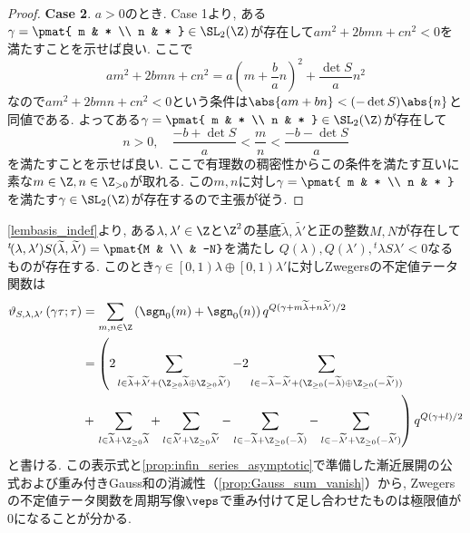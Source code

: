 \documentclass[11pt,b5paper,oneside,lualatex]{ltjsarticle} %
\numberwithin{equation}{section} %
\begin{document}
\begin{proof}
	\textbf{Case 2}. $ a > 0 $のとき. 
	Case 1より, ある$ \gamma = \pmat{ m & * \\ n & * } \in \SL_2(\Z) $が存在して$ a m^2 + 2b mn + c n^2 < 0 $を満たすことを示せば良い. 
	ここで
	\[
	a m^2 + 2b mn + c n^2
	=
	a \left( m + \frac{b}{a} n \right)^2 +\frac{\det S}{a} n^2
	\]
	なので$ a m^2 + 2b mn + c n^2 < 0 $という条件は$ \abs{ a m + b n } < (-\det S) \abs{n} $と同値である. 
	よってある$ \gamma = \pmat{ m & * \\ n & * } \in \SL_2(\Z) $が存在して
	\[
	n>0, \quad
	\frac{-b + \det S}{a} < \frac{m}{n} < \frac{-b - \det S}{a}
	\]
	を満たすことを示せば良い. 
	ここで有理数の稠密性からこの条件を満たす互いに素な$ m \in \Z, n \in \Z_{>0} $が取れる. 
	この$ m, n $に対し$ \gamma = \pmat{ m & * \\ n & * } $を満たす$ \gamma \in \SL_2(\Z) $が存在するので主張が従う. 
\end{proof}

\begin{rem} \label{rem:Zwegers_lim}
	\cref{lembasis_indef}より, ある$ \lambda, \lambda' \in \Z $と$ \Z^2 $の基底$ \widetilde{\lambda}, \widetilde{\lambda'} $と正の整数$ M, N $が存在して
	$ {}^t\!(\lambda, \lambda') S (\widetilde{\lambda}, \widetilde{\lambda'}) = \pmat{M & \\ & -N} $を満たし
	$ Q(\lambda), Q(\lambda'), {}^t\!\lambda S \lambda' < 0 $なるものが存在する. 
	このとき$ \gamma \in \left[ 0, 1\right) \lambda \oplus \left[ 0, 1\right) \lambda' $に対しZwegersの不定値テータ関数は
	\begin{align} 
		\vartheta_{S, \lambda, \lambda'} \left( \gamma \tau; \tau \right)
		&=
		\sum_{m, n \in \Z} \left( \sgn_0(m) + \sgn_0(n) \right) q^{Q(\gamma + m\widetilde{\lambda} + n\widetilde{\lambda'})/2}
		\\
		&=
		\left(
		2 \sum_{l \in \widetilde{\lambda} + \widetilde{\lambda'} + (\Z_{\ge 0} \widetilde{\lambda} \oplus \Z_{\ge 0} \widetilde{\lambda'})}
		-
		2 \sum_{l \in - \widetilde{\lambda} - \widetilde{\lambda'} + (\Z_{\ge 0} (-\widetilde{\lambda}) \oplus \Z_{\ge 0} (-\widetilde{\lambda'}))}
		\right.
		\\
		&+
		\left.
		\sum_{l \in \widetilde{\lambda} + \Z_{\ge 0} \widetilde{\lambda}}
		+
		\sum_{l \in \widetilde{\lambda'} + \Z_{\ge 0} \widetilde{\lambda'}}
		-
		\sum_{l \in -\widetilde{\lambda} + \Z_{\ge 0} (-\widetilde{\lambda})}
		-
		\sum_{l \in -\widetilde{\lambda'} + \Z_{\ge 0} (-\widetilde{\lambda'})}
		\right)
		q^{Q(\gamma + l)/2}
	\end{align}
	と書ける. 
	この表示式と\cref{prop:infin_series_asymptotic}で準備した漸近展開の公式および重み付きGauss和の消滅性（\cref{prop:Gauss_sum_vanish}）から, Zwegersの不定値テータ関数を周期写像$ \veps $で重み付けて足し合わせたものは極限値が$ 0 $になることが分かる. 
\end{rem}
\end{document}
